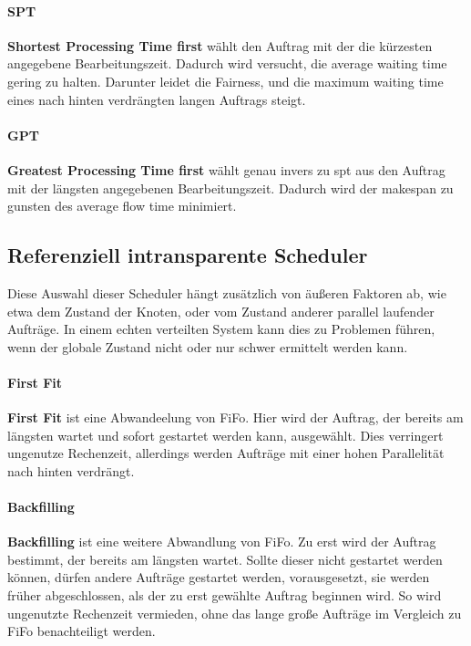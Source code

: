 \paragraph{SPT}
\textbf{Shortest Processing Time first} wählt den Auftrag mit der die kürzesten angegebene Bearbeitungszeit. Dadurch wird versucht, die average waiting time gering zu halten. Darunter leidet die Fairness, und die maximum waiting time eines nach hinten verdrängten langen Auftrags steigt.

\paragraph{GPT}
\textbf{Greatest Processing Time first} wählt genau invers zu spt aus den Auftrag mit der längsten angegebenen Bearbeitungszeit. Dadurch wird der makespan zu gunsten des average flow time minimiert.

\subsection{Referenziell intransparente Scheduler}
Diese Auswahl dieser Scheduler hängt zusätzlich von äußeren Faktoren ab, wie etwa dem Zustand der Knoten, oder vom Zustand anderer parallel laufender Aufträge. In einem echten verteilten System kann dies zu Problemen führen, wenn der globale Zustand nicht oder nur schwer ermittelt werden kann.

\paragraph{First Fit}
\textbf{First Fit} ist eine Abwandeelung von FiFo. Hier wird  der Auftrag, der bereits am längsten wartet und sofort gestartet werden kann, ausgewählt. Dies verringert ungenutze Rechenzeit, allerdings werden Aufträge mit einer hohen Parallelität nach hinten verdrängt.

\paragraph{Backfilling}
\textbf{Backfilling} ist eine weitere Abwandlung von FiFo. Zu erst wird der Auftrag bestimmt, der bereits am längsten wartet. Sollte dieser nicht gestartet werden können, dürfen andere Aufträge gestartet werden, vorausgesetzt, sie werden früher abgeschlossen, als der zu erst gewählte Auftrag beginnen wird. So wird ungenutzte Rechenzeit vermieden, ohne das lange große Aufträge im Vergleich zu FiFo benachteiligt werden.

